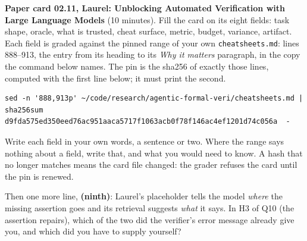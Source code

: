 \documentclass[11pt]{article}
\begin{document}
\begin{problem}\label{prob:B2}
\textbf{Paper card 02.11, Laurel: Unblocking Automated Verification with
Large Language Models} (10 minutes). Fill the card on its eight fields: task
shape, oracle, what is trusted, cheat surface, metric, budget, variance,
artifact. Each field is graded against the pinned range of your own
\texttt{cheatsheets.md}: lines 888--913, the entry from its heading to its
\emph{Why it matters} paragraph, in the copy the command below names. The pin
is the sha256 of exactly those lines, computed with the first line below; it
must print the second.
{\small
\begin{verbatim}
sed -n '888,913p' ~/code/research/agentic-formal-veri/cheatsheets.md | sha256sum
d9fda575ed350eed76ac951aaca5717f1063acb0f78f146ac4ef1201d74c056a  -
\end{verbatim}
}
Write each field in your own words, a sentence or two. Where the range says
nothing about a field, write that, and what you would need to know. A hash
that no longer matches means the card file changed: the grader refuses the
card until the pin is renewed.

Then one more line, \textbf{(ninth)}: Laurel's placeholder tells the model
\emph{where} the missing assertion goes and its retrieval suggests
\emph{what} it says. In H3 of Q10 (the assertion repairs), which of the two
did the verifier's error message already give you, and which did you have to
supply yourself?
\end{problem}
\end{document}
